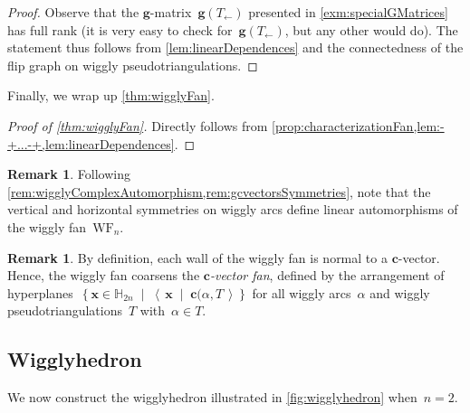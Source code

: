 \documentclass{amsart}
\theoremstyle{definition}
\newtheorem{remark}[theorem]{Remark}
\newcommand{\HH}{\mathbb{H}} %
\renewcommand{\b}[1]{{\boldsymbol{#1}}} %
\newcommand{\set}[2]{\left\{ #1 \;\middle|\; #2 \right\}} %
\newcommand{\dotprod}[2]{\left\langle \, #1 \; \middle| \; #2 \, \right\rangle} %
\newcommand{\darkblue}{\color{darkblue}} %
\newcommand{\defn}[1]{\textsl{\darkblue #1}} %
\newcommand{\polytope}[1]{\mathds{#1}} %
\newcommand{\wigglyFan}{\mathrm{WF}} %
\newcommand{\wigglyhedron}{\polytope{W}} %
\begin{document}
\begin{proof}
Observe that the $\b{g}$-matrix~$\b{g}(T_\leftarrow)$ presented in \cref{exm:specialGMatrices} has full rank (it is very easy to check for~$\b{g}(T_\leftarrow)$, but any other would do).
The statement thus follows from \cref{lem:linearDependences} and the connectedness of the flip graph on wiggly pseudotriangulations.
\end{proof}

Finally, we wrap up \cref{thm:wigglyFan}.

\begin{proof}[Proof of \cref{thm:wigglyFan}]
Directly follows from \cref{prop:characterizationFan,lem:-+...-+,lem:linearDependences}.
\end{proof}

\begin{remark}
\label{rem:wigglyFanSymmetries}
Following \cref{rem:wigglyComplexAutomorphism,rem:gcvectorsSymmetries}, note that the vertical and horizontal symmetries on wiggly arcs define linear automorphisms of the wiggly fan~$\wigglyFan_n$.
\end{remark}

\begin{remark}
By definition, each wall of the wiggly fan is normal to a $\b{c}$-vector.
Hence, the wiggly fan coarsens the \defn{$\b{c}$-vector fan}, defined by the arrangement of hyperplanes~$\set{\b{x} \in \HH_{2n}}{\dotprod{\b{x}}{\b{c}(\alpha, T}}$ for all wiggly arcs~$\alpha$ and wiggly pseudotriangulations~$T$ with~$\alpha \in T$.
\end{remark}


\subsection{Wigglyhedron}
\label{subsec:wigglyhedron}

We now construct the wigglyhedron illustrated in \cref{fig:wigglyhedron} when~${n = 2}$.
%
\afterpage{
\begin{figure}
\centerline{}
\caption{The wigglyhedron~$\wigglyhedron_2$.}
\label{fig:wigglyhedron}
\end{figure}
}
\end{document}
